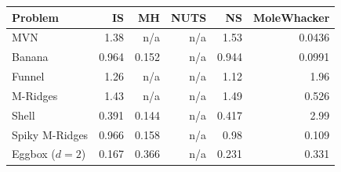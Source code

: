 \begin{tabular}{lrrrrr}
\toprule
Problem & IS & MH & NUTS & NS & MoleWhacker \\
\midrule
MVN & 1.38 & n/a & n/a & 1.53 & 0.0436 \\
Banana & 0.964 & 0.152 & n/a & 0.944 & 0.0991 \\
Funnel & 1.26 & n/a & n/a & 1.12 & 1.96 \\
M-Ridges & 1.43 & n/a & n/a & 1.49 & 0.526 \\
Shell & 0.391 & 0.144 & n/a & 0.417 & 2.99 \\
Spiky M-Ridges & 0.966 & 0.158 & n/a & 0.98 & 0.109 \\
\midrule
Eggbox ($d=2$) & 0.167 & 0.366 & n/a & 0.231 & 0.331 \\
\bottomrule
\end{tabular}
